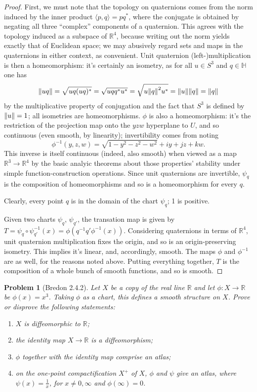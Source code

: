 \documentclass{article}
\newtheorem{plm}{Problem}
\begin{document}
\begin{proof}
  First, we must note that the topology on quaternions comes from the norm induced by the inner product $\langle p, q \rangle = pq^{*}$,
  where the conjugate is obtained by negating all three ``complex'' components of a quaternion.
  This agrees with the topology induced as a subspace of $\mathbb{R}^{4}$, because writing out the norm yields exactly that of Euclidean space;
  we may abusively regard sets and maps in the quaternions in either context, as convenient.
  Unit quaternion (left-)multiplication is then a homeomorphism: it's certainly an isometry,
  as for all $u \in S^{3}$ and $q \in \mathbb{H}$ one has
  \[
    \norm{uq} = \sqrt{uq(uq)^{*}} = \sqrt{uqq^{*}u^{*}} = \sqrt{u\norm{q}^{2}u^{*}} = \norm{u}\norm{q} = \norm{q}
  \]
  by the multiplicative property of conjugation and the fact that $S^{3}$ is defined by $\norm{u} = 1$;
  all isometries are homeomorphisms.
  $\phi$ is also a homeomorphism: it's the restriction of the projection map onto the $yzw$ hyperplane to $U$,
  and so continuous (even smooth, by linearity); invertibility comes from noting
  \[
    \phi^{-1}(y, z, w) = \sqrt{1 - y^{2} - z^{2} - w^{2}} + iy + jz + kw.
  \]
  This inverse is itself continuous (indeed, also smooth) when viewed as a map $\mathbb{R}^{3} \to \mathbb{R}^{4}$
  by the basic analyic theorems about those properties' stability under simple function-construction operations.
  Since unit quaternions are invertible, $\psi_{q}$ is the composition of homeomorphisms and so is a homeomorphism for every $q$.

  Clearly, every point $q$ is in the domain of the chart $\psi_{q}$; 1 is positive.

  Given two charts $\psi_{q}$, $\psi_{q'}$, the transation map is given by $T = \psi_{q} \circ \psi_{q'}^{-1}(x) = \phi(q^{-1}q'\phi^{-1}(x))$.
  Considering quaternions in terms of $\mathbb{R}^{4}$, unit quaternion multiplication fixes the origin, and so is an origin-preserving isometry.
  This implies it's linear, and, accordingly, smooth.
  The maps $\phi$ and $\phi^{-1}$ are as well, for the reasons noted above.
  Putting everything together, $T$ is the composition of a whole bunch of smooth functions, and so is smooth.
\end{proof}

\begin{plm}[Bredon 2.4.2]
  Let $X$ be a copy of the real line $\mathbb{R}$ and let $\phi: X \to \mathbb{R}$ be $\phi(x) = x^{3}$.
  Taking $\phi$ as a chart, this defines a smooth structure on $X$.
  Prove or disprove the following statements:
  \begin{enumerate}
  \item $X$ is diffeomorphic to $\mathbb{R}$;
  \item the identity map $X \to \mathbb{R}$ is a diffeomorphism;
  \item $\phi$ together with the identity map comprise an atlas;
  \item on the one-point compactification $X^{+}$ of $X$,  $\phi$ and $\psi$ give an atlas, where $\psi(x) = \frac{1}{x}$,
    for $x \neq 0, \infty$ and $\phi(\infty) = 0$.
  \end{enumerate}
\end{plm}
\end{document}
